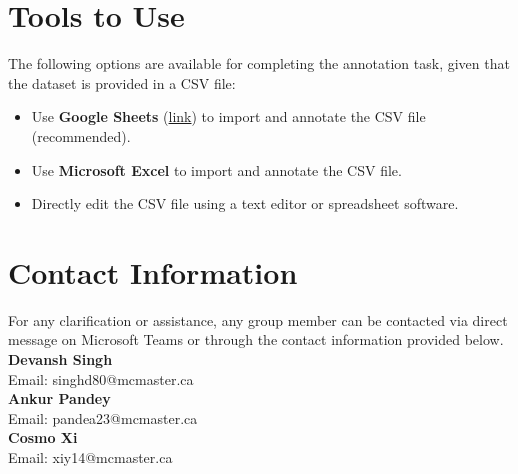 \documentclass[12pt]{article}
\begin{document}
\section{Tools to Use}  
The following options are available for completing the annotation task, given that the dataset is provided in a CSV file:  

\begin{itemize}  
    \item Use \textbf{Google Sheets} (\href{https://workspace.google.com/intl/en_ca/products/sheets/}{link}) to import and annotate the CSV file (recommended).  
    \item Use \textbf{Microsoft Excel} to import and annotate the CSV file.  
    \item Directly edit the CSV file using a text editor or spreadsheet software.  

\end{itemize}  

\section{Contact Information}
For any clarification or assistance, any group member can be contacted via direct message on Microsoft Teams or 
through the contact information provided below.\\
\noindent
\textbf{Devansh Singh} \\
Email: singhd80@mcmaster.ca \\
\noindent
\textbf{Ankur Pandey} \\
Email: pandea23@mcmaster.ca \\
\noindent
\textbf{Cosmo Xi} \\
Email: xiy14@mcmaster.ca
\end{document}
